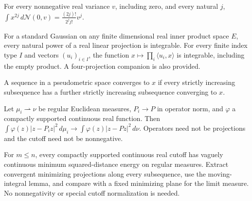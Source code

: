 \begin{lemma}
\label{lem:real-gaussian-even-moments}

For every nonnegative real variance $v$, including zero, and every natural $j$, $\int x^{2j}\,d\mathcal N(0,v)=\frac{(2j)!}{2^j j!}v^j$.
\end{lemma}

\begin{lemma}
\label{lem:gaussian-projection-integrability}

For a standard Gaussian on any finite dimensional real inner product space $E$, every natural power of a real linear projection is integrable. For every finite index type $I$ and vectors $(u_i)_{i\in I}$, the function $x\mapsto\prod_i\langle u_i,x\rangle$ is integrable, including the empty product. A four-projection companion is also provided.
\end{lemma}

\begin{lemma}
\label{lem:subsequence-limit-criterion}

A sequence in a pseudometric space converges to $x$ if every strictly increasing subsequence has a further strictly increasing subsequence converging to $x$.
\end{lemma}

\begin{lemma}
\label{lem:vague-projection-energy}

Let $\mu_i\rightharpoonup\nu$ be regular Euclidean measures, $P_i\to P$ in operator norm, and $\varphi$ a compactly supported continuous real function. Then $\int\varphi(z)|z-P_i z|^2\,d\mu_i\to\int\varphi(z)|z-Pz|^2\,d\nu$. Operators need not be projections and the cutoff need not be nonnegative.
\end{lemma}

\begin{lemma}
\label{lem:flatness-vague-general}

For $m\leq n$, every compactly supported continuous real cutoff has vaguely continuous minimum squared-distance energy on regular measures. Extract convergent minimizing projections along every subsequence, use the moving-integral lemma, and compare with a fixed minimizing plane for the limit measure. No nonnegativity or special cutoff normalization is needed.
\end{lemma}

